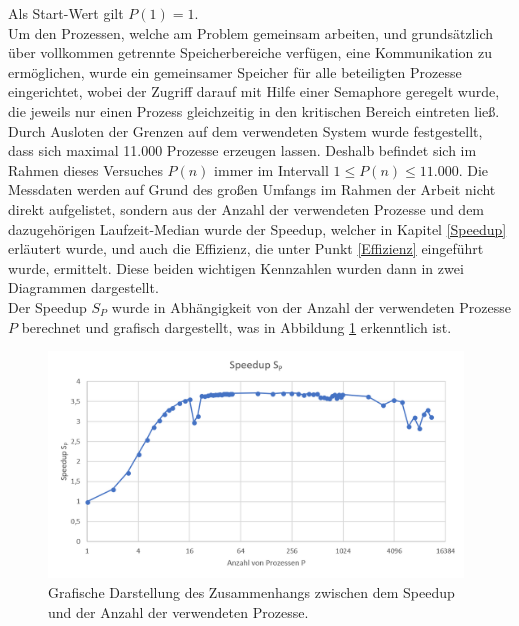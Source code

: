 \begin{description}
						Als Start-Wert gilt $P(1) = 1$.\\
						Um den Prozessen, welche am Problem gemeinsam arbeiten, und grundsätzlich über vollkommen getrennte Speicherbereiche verfügen, eine Kommunikation zu ermöglichen, wurde ein gemeinsamer Speicher für alle beteiligten Prozesse eingerichtet, wobei der Zugriff darauf mit Hilfe einer Semaphore geregelt wurde, die jeweils nur einen Prozess gleichzeitig in den kritischen Bereich eintreten ließ.\\
						Durch Ausloten der Grenzen auf dem verwendeten System wurde festgestellt, dass sich maximal 11.000 Prozesse erzeugen lassen. Deshalb befindet sich im Rahmen dieses Versuches $P(n)$ immer im Intervall $1 \leq P(n) \leq 11.000$.
						Die Messdaten werden auf Grund des großen Umfangs im Rahmen der Arbeit nicht direkt aufgelistet, sondern aus der Anzahl der verwendeten Prozesse und dem dazugehörigen Laufzeit-Median wurde der Speedup, welcher in Kapitel \ref{Speedup} erläutert wurde, und auch die Effizienz, die unter Punkt \ref{Effizienz} eingeführt wurde, ermittelt. Diese beiden wichtigen Kennzahlen wurden dann in zwei Diagrammen dargestellt.\\
						Der Speedup $S_P$ wurde in Abhängigkeit von der Anzahl der verwendeten Prozesse $P$ berechnet und grafisch dargestellt, was in Abbildung \ref{fig:Speedup_Prozesse} erkenntlich ist.
						
						\begin{figure}
							\centering	
							\includegraphics[width=11cm]{Abbildungen/Speedup_Prozesse.png}
							\caption{Grafische Darstellung des Zusammenhangs zwischen dem Speedup und der Anzahl der verwendeten Prozesse.}
							\label{fig:Speedup_Prozesse}
						\end{figure}
					

\end{description}

